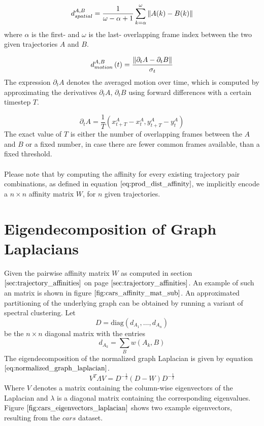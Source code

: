 \begin{equation}
	d_{spatial}^{A,B} = \frac{1}{\omega - \alpha + 1} \sum_{k=\alpha}^\omega \left\lVert A(k) - B(k)\right\rVert
\label{eq:spatial_distance}	
\end{equation}
where $\alpha$ is the first- and $\omega$ is the last- overlapping frame index between the two given trajectories $A$ and $B$.

\begin{equation}
	d_{motion}^{A,B} \left( t \right)  = \frac{\left\lVert\partial_t A - \partial_t B\right\rVert}{\sigma_t}
\label{eq:motion_distance}
\end{equation}
The expression $\partial_t A$ denotes the averaged motion over time, which is computed by approximating the derivatives $\partial_t A$, $\partial_t B$ using forward differences with a certain timestep $T$.

\begin{equation}
	\partial_t A = \frac{1}{T} \left( x_{t+T}^{A} - x_{t}^{A}, y_{t+T}^{A} - y_{t}^{A}\right)
\end{equation}
The exact value of $T$ is either the number of overlapping frames between the $A$ and $B$ or a fixed number, in case there are fewer common frames available, than a fixed threshold. \\ \\
Please note that by computing the affinity for every existing trajectory pair combinations, as defined in equation $\ref{eq:prod_dist_affinity}$, we implicitly encode a $n \times n$ affinity matrix $W$, for $n$ given trajectories. 

\section{Eigendecomposition of Graph Laplacians}
Given the pairwise affinity matrix $W$ as computed in section $\ref{sec:trajectory_affinities}$ on page $\pageref{sec:trajectory_affinities}$. An example of such an matrix is shown in figure $\ref{fig:cars_affinity_mat_sub}$. An approximated partitioning of the underlying graph can be obtained by running a variant of spectral clustering. Let
\begin{equation}
	D = \text{diag} \left( d_{A_1}, \dots, d_{A_n} \right)
\label{eq:def_d_mat}
\end{equation}
be the $n \times n$ diagonal matrix with the entries
\begin{equation}
	d_{A_k} = \sum_B w \left( A_k, B \right)
\end{equation}
The eigendecomposition of the normalized graph Laplacian is given by equation $\ref{eq:normalized_graph_laplacian}$.
\begin{equation}
	V^{T} \Lambda V = D^{-\frac{1}{2}} \left( D - W \right) D^{-\frac{1}{2}}
	\label{eq:normalized_graph_laplacian}
\end{equation}
Where $V$ denotes a matrix containing the column-wise eigenvectors of the Laplacian and $\lambda$ is a diagonal matrix containing the corresponding eigenvalues. Figure $\ref{fig:cars_eigenvectors_laplacian}$ shows two example eigenvectors, resulting from the $\textit{cars}$ dataset.

